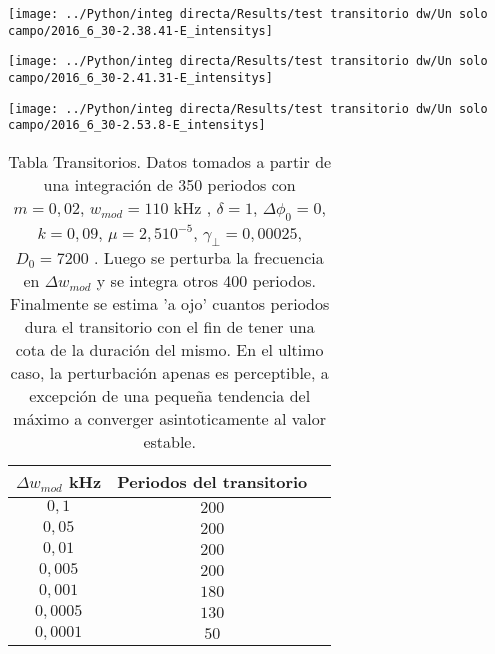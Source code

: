 		\begin{minipage}{0.33\textwidth}
			\centering
			\texttt{[image: ../Python/integ directa/Results/test transitorio dw/Un solo campo/2016\_6\_30-2.38.41-E\_intensitys]}
		\end{minipage}
		\begin{minipage}{0.33\textwidth}
			\centering
			\texttt{[image: ../Python/integ directa/Results/test transitorio dw/Un solo campo/2016\_6\_30-2.41.31-E\_intensitys]}
		\end{minipage}
		\begin{minipage}{0.33\textwidth}
			\centering
			\texttt{[image: ../Python/integ directa/Results/test transitorio dw/Un solo campo/2016\_6\_30-2.53.8-E\_intensitys]}
		\end{minipage}
		
		
			\begin{center}
				\begin{table}[htp]
					\begin{tabular}{|c|c|c|}
						\hline
						$\Delta w_{mod}$ kHz  & Periodos del transitorio \Ts \Bs   \\ \hline
						$0,1$		  &        		$200$					  \\ \hline
						$0,05$		  &        		$200$					  \\ \hline					  	
	   				  $0,01$        &        		$200$					  \\ \hline
						$0,005$       &        		$200$					  \\ \hline		
						$0,001$       &        		$180$					  \\ \hline
						$0,0005$      &        		$130$				  	  \\ \hline
						$0,0001$      &        		$50$				     	\\ \hline 						  
						
					\end{tabular}
					\caption{Tabla Transitorios. Datos tomados a partir de una integración de 350 periodos con $m=0,02$, $w_{mod}=110$ kHz , $\delta=1$, $\Delta \phi_0=0$, $k=0,09$, $\mu=2,5 10^{-5}$, $\gamma_{\bot}=0,00025$, $D_0=7200$ . Luego se perturba la frecuencia en $\Delta w_{mod}$ y se integra otros 400 periodos. Finalmente se estima 'a ojo' cuantos periodos dura el transitorio con el fin de tener una cota de la duración del mismo.
						En el ultimo caso, la perturbación apenas es perceptible, a excepción de una pequeña tendencia del máximo a converger asintoticamente al valor estable.
					}
					\label{tab: trans two field}
				\end{table}
			\end{center}
		
